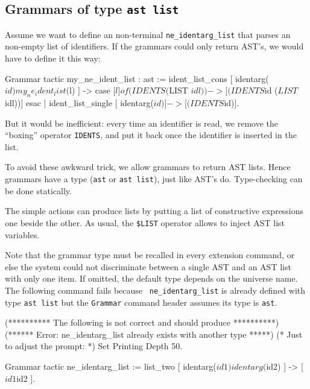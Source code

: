 \subsection{Grammars of type {\tt ast list}}

Assume we want to define an non-terminal {\tt ne\_identarg\_list} that
parses an non-empty list of identifiers. If the grammars could only
return AST's, we would have to define it this way:

\begin{coq_example*}
Grammar tactic my_ne_ident_list : ast :=
  ident_list_cons [ identarg($id) my_ne_ident_list($l) ] ->
    case [$l] of
      (IDENTS ($LIST $idl)) -> [(IDENTS $id ($LIST $idl))]
    esac
| ident_list_single [ identarg($id) ] -> [(IDENTS $id)].
\end{coq_example*}

But it would be inefficient: every time an identifier is read, we
remove the ``boxing'' operator {\tt IDENTS}, and put it back once the
identifier is inserted in the list.

To avoid these awkward trick, we allow grammars to return AST
lists. Hence grammars have a type ({\tt ast} or {\tt ast list}), just like
AST's do. Type-checking can be done statically.

The simple actions can produce lists by putting a list of constructive
expressions one beside the other. As usual, the {\tt\$LIST} operator
allows to inject AST list variables.


Note that the grammar type must be recalled in every extension
command, or else the system could not discriminate between a single
AST and an AST list with only one item. If omitted, the default type
depends on the universe name. The following command fails because {\tt
ne\_identarg\_list} is already defined with type {\tt ast list} but the
{\tt Grammar} command header assumes its type is {\tt ast}.

\begin{coq_eval}
(********** The following is not correct and should produce **********)
(****** Error: ne_identarg_list already exists with another type *****)
(* Just to adjust the prompt: *) Set Printing Depth 50.
\end{coq_eval}
\begin{coq_example}           
Grammar tactic ne_identarg_list :=
  list_two [ identarg($id1) identarg($id2) ] -> [ $id1 $id2 ]. 
\end{coq_example}

